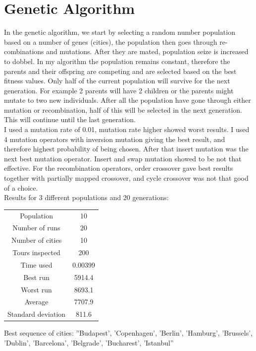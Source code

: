 \documentclass[a4paper,12pt]{article}
\begin{document}
\section{Genetic Algorithm}
In the genetic algorithm, we start by selecting a random number population based on a number of genes (cities), the population then goes through re-combinations and mutations. After they are mated, population seize is increased to dobbel. In my algorithm the population remains constant, therefore the parents and their offspring are competing and are selected based on the best fitness values. Only half of the current population will survive for the next generation. For example 2 parents will have 2 children or the parents might mutate to two new individuals. After all the population have gone through either mutation or recombination, half of this will be selected in the next generation. This will continue until the last generation.\\ 

I used a mutation rate of 0.01, mutation rate higher showed worst results. I used 4 mutation operators with inversion mutation giving the best result, and therefore highest probability of being chosen. After that insert mutation was the next best mutation operator. Insert and swap mutation showed to be not that effective. For the recombination operators, order crossover gave best results together with partially mapped crossover, and cycle crossover was not that good of a choice.\\

Results for 3 different populations and 20 generations:\\
\begin{center}
\begin{tabular}{ c c}
 Population & 10  \\ 
 Number of runs & 20  \\ 
 Number of cities & 10  \\  
Tours inspected & 200  \\
 Time used & 0.00399   \\  
 Best run & 5914.4  \\ 
Worst run &  8693.1  \\ 
Average & 7707.9   \\ 
 Standard deviation & 811.6   \\ 


\end{tabular}
\end{center}
Best sequence of cities: ''Budapest', 'Copenhagen', 'Berlin', 'Hamburg', 'Brussels', 'Dublin', 'Barcelona', 'Belgrade', 'Bucharest', 'Istanbul'' \\ 
\end{document}
